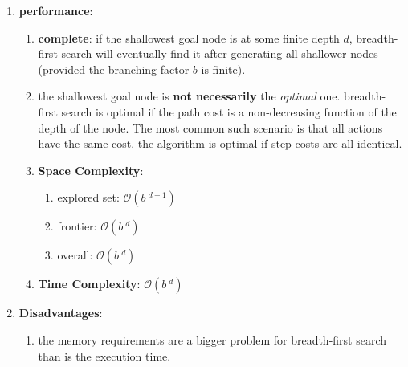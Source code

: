 \begin{enumerate}
    \item \textbf{performance}:
    \begin{enumerate}
        \item \textbf{complete}: if the shallowest goal node is at some finite depth $d$, breadth-first search will eventually find it after generating all shallower nodes (provided the branching factor $b$ is finite).
        \hfill \cite{ai/book/Artificial-Intelligence-A-Modern-Approach/Russell-Norvig}

        \item  the shallowest goal node is \textbf{not necessarily} the \textit{optimal} one.
        breadth-first search is optimal if the path cost is a non-decreasing function of the depth of the node.
        The most common such scenario is that all actions have the same cost.
        the algorithm is optimal if step costs are all identical.
        \hfill \cite{ai/book/Artificial-Intelligence-A-Modern-Approach/Russell-Norvig}

        \item \textbf{Space Complexity}:
        \begin{enumerate}
            \item explored set: $\mathcal{O}(b\ ^{d-1})$
            \hfill \cite{ai/book/Artificial-Intelligence-A-Modern-Approach/Russell-Norvig}

            \item frontier: $\mathcal{O}(b\ ^{d})$
            \hfill \cite{ai/book/Artificial-Intelligence-A-Modern-Approach/Russell-Norvig}

            \item overall: $\mathcal{O}(b\ ^{d})$
            \hfill \cite{ai/book/Artificial-Intelligence-A-Modern-Approach/Russell-Norvig}
        \end{enumerate}

        \item \textbf{Time Complexity}:
        $\mathcal{O}(b\ ^{d})$
        \hfill \cite{ai/book/Artificial-Intelligence-A-Modern-Approach/Russell-Norvig}

    \end{enumerate}

    \item \textbf{Disadvantages}:
    \begin{enumerate}
        \item the memory requirements are a bigger problem for breadth-first search than is the execution time.
        \hfill \cite{ai/book/Artificial-Intelligence-A-Modern-Approach/Russell-Norvig}


    \end{enumerate}

\end{enumerate}


